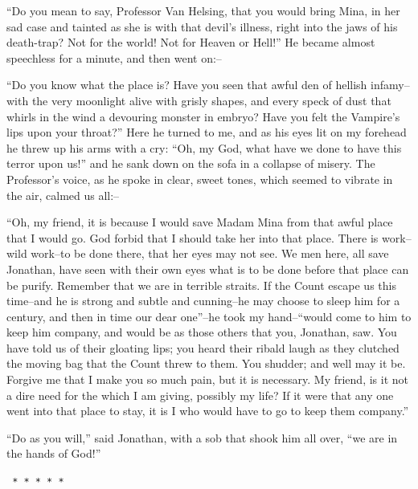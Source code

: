 \documentclass[12pt,openright]{book}
\begin{document}
“Do you mean to say, Professor Van Helsing, that you would bring Mina, in her sad case and tainted as she is with that devil’s illness, right into the jaws of his death-trap? Not for the world! Not for Heaven or Hell!” He became almost speechless for a minute, and then went on:–

“Do you know what the place is? Have you seen that awful den of hellish infamy–with the very moonlight alive with grisly shapes, and every speck of dust that whirls in the wind a devouring monster in embryo? Have you felt the Vampire’s lips upon your throat?” Here he turned to me, and as his eyes lit on my forehead he threw up his arms with a cry: “Oh, my God, what have we done to have this terror upon us!” and he sank down on the sofa in a collapse of misery. The Professor’s voice, as he spoke in clear, sweet tones, which seemed to vibrate in the air, calmed us all:–

“Oh, my friend, it is because I would save Madam Mina from that awful place that I would go. God forbid that I should take her into that place. There is work–wild work–to be done there, that her eyes may not see. We men here, all save Jonathan, have seen with their own eyes what is to be done before that place can be purify. Remember that we are in terrible straits. If the Count escape us this time–and he is strong and subtle and cunning–he may choose to sleep him for a century, and then in time our dear one”–he took my hand–“would come to him to keep him company, and would be as those others that you, Jonathan, saw. You have told us of their gloating lips; you heard their ribald laugh as they clutched the moving bag that the Count threw to them. You shudder; and well may it be. Forgive me that I make you so much pain, but it is necessary. My friend, is it not a dire need for the which I am giving, possibly my life? If it were that any one went into that place to stay, it is I who would have to go to keep them company.”

“Do as you will,” said Jonathan, with a sob that shook him all over, “we are in the hands of God!”

\texttt{   *       *       *       *       *}
\end{document}
